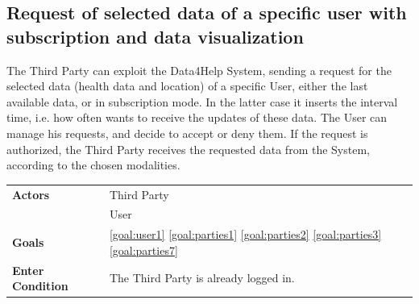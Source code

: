  \subsection{Request of selected data of a specific user with subscription and data visualization}
 
The Third Party can exploit the Data4Help System, sending a request for the selected data (health data and location) of a specific User, either the last available data, or in subscription mode.  
In the latter case it inserts the interval time, i.e. how often wants to receive the updates of these data.
The User can manage his requests, and decide to accept or deny them. If the request is authorized, the Third Party receives the requested data from the System, according to the chosen modalities.

\begin{table}[H]
	\centering
    
    \begin{tabular}{|p{3.5cm}|p{10.3cm}|}
    
    \hline
    \textbf{\large{Actors}} & Third Party \\
	& User \\		 			
    \hline
    \textbf{\large{Goals}} 				&\ref{goal:user1} \ref{goal:parties1} \ref{goal:parties2} \ref{goal:parties3} \ref{goal:parties7}\\
    
    \hline
    \textbf{\large{Enter Condition}} & The Third Party is already logged in.\\
    

\end{tabular}
\end{table}
